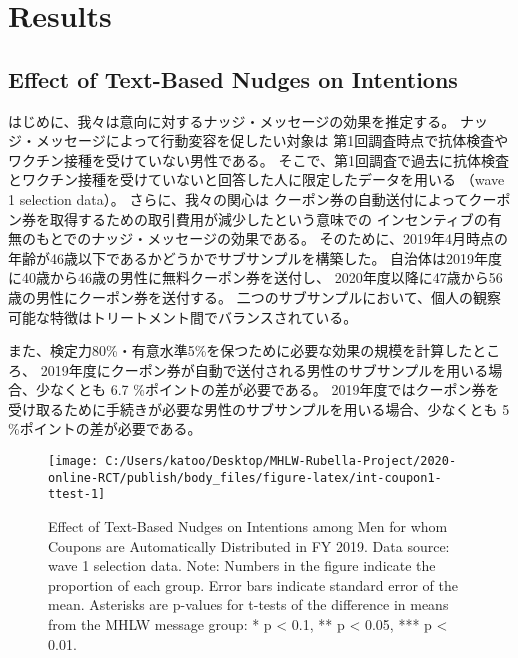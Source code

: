 \documentclass[
  11pt,
  a4paper,
]{article}
\begin{document}
\hypertarget{result}{%
\section{Results}\label{result}}

\hypertarget{effect-of-text-based-nudges-on-intentions}{%
\subsection{Effect of Text-Based Nudges on Intentions}\label{effect-of-text-based-nudges-on-intentions}}

はじめに、我々は意向に対するナッジ・メッセージの効果を推定する。
ナッジ・メッセージによって行動変容を促したい対象は
第1回調査時点で抗体検査やワクチン接種を受けていない男性である。
そこで、第1回調査で過去に抗体検査とワクチン接種を受けていないと回答した人に限定したデータを用いる
（wave 1 selection data）。
さらに、我々の関心は
クーポン券の自動送付によってクーポン券を取得するための取引費用が減少したという意味での
インセンティブの有無のもとでのナッジ・メッセージの効果である。
そのために、2019年4月時点の年齢が46歳以下であるかどうかでサブサンプルを構築した。
自治体は2019年度に40歳から46歳の男性に無料クーポン券を送付し、
2020年度以降に47歳から56歳の男性にクーポン券を送付する。
二つのサブサンプルにおいて、個人の観察可能な特徴はトリートメント間でバランスされている。

また、検定力80\%・有意水準5\%を保つために必要な効果の規模を計算したところ、
2019年度にクーポン券が自動で送付される男性のサブサンプルを用いる場合、少なくとも
6.7
\%ポイントの差が必要である。
2019年度ではクーポン券を受け取るために手続きが必要な男性のサブサンプルを用いる場合、少なくとも
5
\%ポイントの差が必要である。

\begin{figure}[t]
\texttt{[image: C:/Users/katoo/Desktop/MHLW-Rubella-Project/2020-online-RCT/publish/body\_files/figure-latex/int-coupon1-ttest-1]} \caption{Effect of Text-Based Nudges on Intentions among Men for whom Coupons are Automatically Distributed in FY 2019. Data source: wave 1 selection data. Note: Numbers in the figure indicate the proportion of each group. Error bars indicate standard error of the mean. Asterisks are p-values for t-tests of the difference in means from the MHLW message group: * p < 0.1, ** p < 0.05, *** p < 0.01.}\label{fig:int-coupon1-ttest}
\end{figure}
\end{document}
